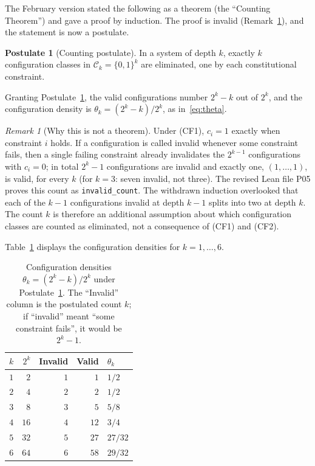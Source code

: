 \documentclass[12pt]{amsart}
\theoremstyle{plain}
\theoremstyle{definition}
\newtheorem{postulate}[theorem]{Postulate}
\theoremstyle{remark}
\newtheorem{remark}[theorem]{Remark}
\newcommand{\Ck}{\mathcal{C}_k}
\newcommand{\thetak}{\theta_k}
\begin{document}
The February version stated the following as a theorem (the ``Counting
Theorem'') and gave a proof by induction. The proof is invalid
(Remark~\ref{rem:count}), and the statement is now a postulate.

\begin{postulate}[Counting postulate]
\label{post:count}
In a system of depth $k$, exactly $k$ configuration classes in
$\Ck = \{0,1\}^k$ are eliminated, one by each constitutional constraint.
\end{postulate}

Granting Postulate~\ref{post:count}, the valid configurations number $2^k - k$
out of $2^k$, and the configuration density is $\thetak = (2^k - k)/2^k$, as
in~\eqref{eq:theta}.

\begin{remark}[Why this is not a theorem]
\label{rem:count}
Under (CF1), $c_i = 1$ exactly when constraint $i$ holds. If a configuration is
called invalid whenever some constraint fails, then a single failing constraint
already invalidates the $2^{k-1}$ configurations with $c_i = 0$; in total
$2^k - 1$ configurations are invalid and exactly one, $(1, \ldots, 1)$, is
valid, for every $k$ (for $k = 3$: seven invalid, not three). The revised Lean
file P05 proves this count as \texttt{invalid\_count}. The withdrawn induction
overlooked that each of the $k - 1$ configurations invalid at depth $k - 1$
splits into two at depth $k$. The count $k$ is therefore an additional
assumption about which configuration classes are counted as eliminated, not a
consequence of (CF1) and (CF2).
\end{remark}

Table~\ref{tab:theta} displays the configuration densities for
$k = 1, \ldots, 6$.

\begin{table}[h]
\centering
\caption{Configuration densities $\thetak = (2^k - k)/2^k$ under
  Postulate~\ref{post:count}. The ``Invalid'' column is the postulated count
  $k$; if ``invalid'' meant ``some constraint fails'', it would be $2^k - 1$.}
\label{tab:theta}
\begin{tabular}{rrrrl}
\toprule
$k$ & $2^k$ & Invalid & Valid & $\thetak$ \\
\midrule
$1$ & $2$  & $1$ & $1$  & $1/2$ \\
$2$ & $4$  & $2$ & $2$  & $1/2$ \\
$3$ & $8$  & $3$ & $5$  & $5/8$ \\
$4$ & $16$ & $4$ & $12$ & $3/4$ \\
$5$ & $32$ & $5$ & $27$ & $27/32$ \\
$6$ & $64$ & $6$ & $58$ & $29/32$ \\
\bottomrule
\end{tabular}
\end{table}
\end{document}

